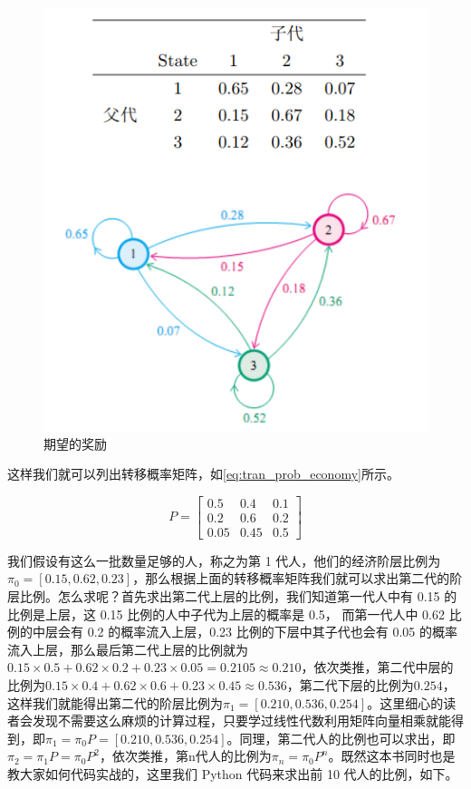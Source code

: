 \begin{figure}[hbt]
    \centering
    \includegraphics[width=0.5\linewidth]{ch6/figs/markov_economy.png}
    \caption{期望的奖励}
    \label{fig:markov_economy}
\end{figure}

这样我们就可以列出转移概率矩阵，如\eqref{eq:tran_prob_economy}所示。

\begin{equation}
    \label{eq:tran_prob_economy}
    P=\left[\begin{array}{lll}
    0.5 & 0.4 & 0.1 \\
    0.2 & 0.6 & 0.2 \\
    0.05 & 0.45 & 0.5
    \end{array}\right]
\end{equation}

我们假设有这么一批数量足够的人，称之为第 1 代人，他们的经济阶层比例为$\pi_0=[0.15,0.62,0.23]$，那么根据上面的转移概率矩阵我们就可以求出第二代的阶层比例。怎么求呢？首先求出第二代上层的比例，我们知道第一代人中有 0.15 的比例是上层，这 0.15 比例的人中子代为上层的概率是 0.5， 而第一代人中 0.62 比例的中层会有 0.2 的概率流入上层，0.23 比例的下层中其子代也会有 0.05 的概率流入上层，那么最后第二代上层的比例就为 $0.15 \times 0.5 + 0.62 \times 0.2 + 0.23 \times 0.05 = 0.2105 \approx 0.210$，依次类推，第二代中层的比例为$0.15 \times 0.4 + 0.62 \times 0.6 + 0.23 \times 0.45 \approx 0.536$，第二代下层的比例为$0.254$，这样我们就能得出第二代的阶层比例为$\pi_1=[0.210,0.536,0.254]$。这里细心的读者会发现不需要这么麻烦的计算过程，只要学过线性代数利用矩阵向量相乘就能得到，即$\pi_1 = \pi_0 P = [0.210,0.536,0.254]$。同理，第二代人的比例也可以求出，即 $\pi_2 = \pi_1 P = \pi_0 P^2$，依次类推，第n代人的比例为$\pi_n = \pi_0 P^n$。既然这本书同时也是教大家如何代码实战的，这里我们 Python 代码来求出前 10 代人的比例，如下。


